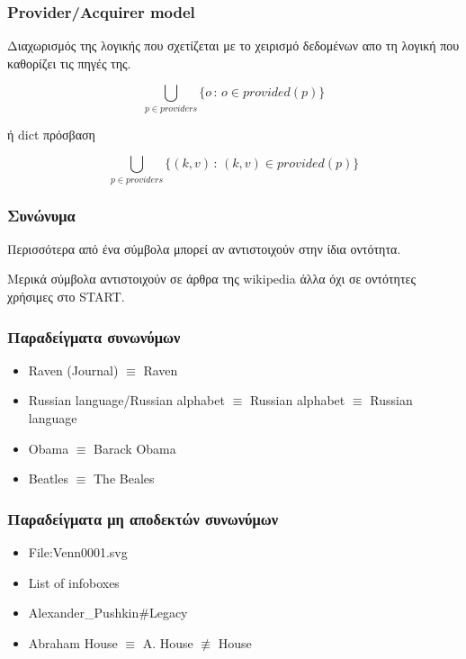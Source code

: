 \documentclass[bigger]{beamer}
\begin{document}
\begin{frame}
  \frametitle{Provider/Acquirer model}

  Διαχωρισμός της λογικής που σχετίζεται με το χειρισμό δεδομένων απο
  τη λογική που καθορίζει τις πηγές της.

  \vfill

  \[
    \bigcup_{p \in providers} \{ o \, : \, o \in provided(p) \}
  \]

  ή dict πρόσβαση

  \[
    \bigcup_{p \in providers} \{ (k, v)\, : \, (k, v) \in provided(p) \}
  \]

  \vfill

\end{frame}

\begin{frame}
  \frametitle{Συνώνυμα}

  Περισσότερα από ένα σύμβολα μπορεί αν αντιστοιχούν στην ίδια
  οντότητα.

  \hfill

  Μερικά σύμβολα αντιστοιχούν σε άρθρα της wikipedia άλλα όχι σε
  οντότητες χρήσιμες στο START.

\end{frame}

\begin{frame}
  \frametitle{Παραδείγματα συνωνύμων}

  \begin{itemize}
  \item Raven (Journal) \(\equiv\) Raven
  \item Russian language/Russian alphabet \(\equiv\) Russian alphabet
    \(\equiv\) Russian language
  \item Obama \(\equiv\) Barack Obama
  \item Beatles \(\equiv\) The Beales
  \end{itemize}

\end{frame}

\begin{frame}
  \frametitle{Παραδείγματα μη αποδεκτών συνωνύμων}
  \begin{itemize}
  \item File:Venn0001.svg
  \item List of infoboxes
  \item Alexander\_Pushkin\#Legacy
  \item Abraham House \(\equiv\) A. House \(\not\equiv\) House
  \end{itemize}
\end{frame}
\end{document}
